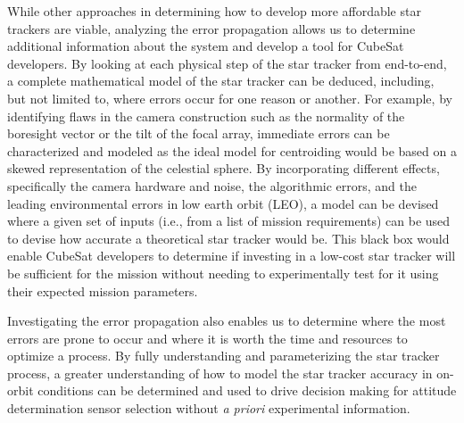 \par \qquad While other approaches in determining how to develop more affordable star trackers are viable, analyzing the error propagation allows us to determine additional information about the system and develop a tool for CubeSat developers.
By looking at each physical step of the star tracker from end-to-end, a complete mathematical model of the star tracker can be deduced, including, but not limited to, where errors occur for one reason or another.
For example, by identifying flaws in the camera construction such as the normality of the boresight vector or the tilt of the focal array, immediate errors can be characterized and modeled as the ideal model for centroiding would be based on a skewed representation of the celestial sphere.
By incorporating different effects, specifically the camera hardware and noise, the algorithmic errors, and the leading environmental errors in low earth orbit (LEO), a model can be devised where a given set of inputs (i.e., from a list of mission requirements) can be used to devise how accurate a theoretical star tracker would be.
This black box would enable CubeSat developers to determine if investing in a low-cost star tracker will be sufficient for the mission without needing to experimentally test for it using their expected mission parameters.

\par \qquad Investigating the error propagation also enables us to determine where the most errors are prone to occur and where it is worth the time and resources to optimize a process. 
By fully understanding and parameterizing the star tracker process, a greater understanding of how to model the star tracker accuracy in on-orbit conditions can be determined and used to drive decision making for attitude determination sensor selection without \emph{a priori} experimental information.

